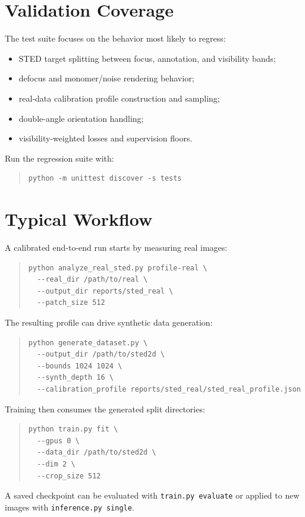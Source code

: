 \documentclass[11pt, a4paper]{article}
\begin{document}
\section{Validation Coverage}

The test suite focuses on the behavior most likely to regress:
\begin{itemize}
    \item STED target splitting between focus, annotation, and visibility bands;
    \item defocus and monomer/noise rendering behavior;
    \item real-data calibration profile construction and sampling;
    \item double-angle orientation handling;
    \item visibility-weighted losses and supervision floors.
\end{itemize}
Run the regression suite with:
\begin{quote}
\small
\begin{verbatim}
python -m unittest discover -s tests
\end{verbatim}
\end{quote}

\section{Typical Workflow}

A calibrated end-to-end run starts by measuring real images:
\begin{quote}
\small
\begin{verbatim}
python analyze_real_sted.py profile-real \
  --real_dir /path/to/real \
  --output_dir reports/sted_real \
  --patch_size 512
\end{verbatim}
\end{quote}
The resulting profile can drive synthetic data generation:
\begin{quote}
\small
\begin{verbatim}
python generate_dataset.py \
  --output_dir /path/to/sted2d \
  --bounds 1024 1024 \
  --synth_depth 16 \
  --calibration_profile reports/sted_real/sted_real_profile.json
\end{verbatim}
\end{quote}
Training then consumes the generated split directories:
\begin{quote}
\small
\begin{verbatim}
python train.py fit \
  --gpus 0 \
  --data_dir /path/to/sted2d \
  --dim 2 \
  --crop_size 512
\end{verbatim}
\end{quote}
A saved checkpoint can be evaluated with \texttt{train.py evaluate} or applied
to new images with \texttt{inference.py single}.
\end{document}
